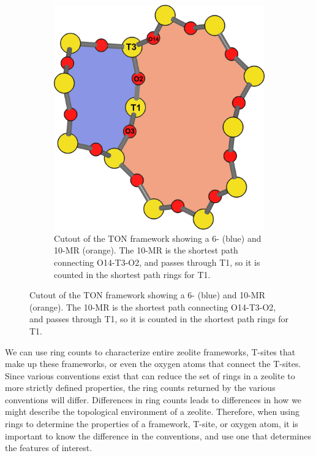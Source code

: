 \documentclass[preprint,numrefs,noinfo,sort&compress]{elsarticle}
\begin{document}
\begin{figure}
\begin{figure}[H]
\centering
\includegraphics[width=\textwidth]{figures/chapter-3/ton-6-10.pdf}
\caption{Cutout of the TON framework showing a 6- (blue) and 10-MR (orange). The 10-MR is the shortest path connecting O14-T3-O2, and passes through T1, so it is counted in the shortest path rings for T1. \label{fig:3.4}}
\end{figure}
\end{figure}

We can use ring counts to characterize entire zeolite frameworks, T-sites that make up these frameworks, or even the oxygen atoms that connect the T-sites. Since various conventions exist that can reduce the set of rings in a zeolite to more strictly defined properties, the ring counts returned by the various conventions will differ. Differences in ring counts leads to differences in how we might describe the topological environment of a zeolite. Therefore, when using rings to determine the properties of a framework, T-site, or oxygen atom, it is important to know the difference in the conventions, and use one that determines the features of interest. 
\end{document}
